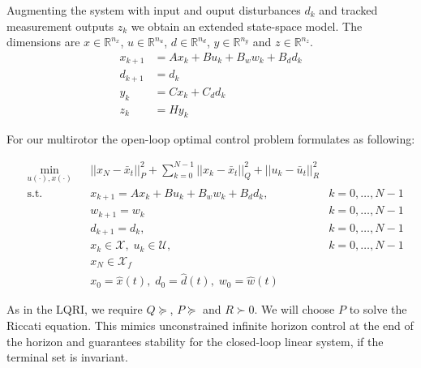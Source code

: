 Augmenting the system with input and ouput disturbances $d_k$ and tracked measurement outputs $z_k$ we obtain an extended state-space model. The dimensions are $x\in\mathbb{R}^{n_x}$, $u\in\mathbb{R}^{n_u}$, $d\in\mathbb{R}^{n_d}$, $y\in\mathbb{R}^{n_y}$ and $z\in\mathbb{R}^{n_z}$.
\begin{align}
x_{k+1} &= A x_k + B u_k + B_w w_k + B_d d_k \label{eq:MPC_dt}\\
d_{k+1} &= d_k \nonumber \\ 
y_{k} &= C x_k + C_d d_k \nonumber \\
z_k &= H y_k 
\end{align}

For our multirotor the open-loop optimal control problem formulates as following:

\begin{align}
&\min_{u(\cdot),x(\cdot)}
& & ||x_N-\bar{x}_t||_P^2 + \sum_{k=0}^{N-1} ||x_k - \bar{x}_t||_Q^2 + ||u_k - \bar{u}_t||_R^2  \nonumber\\
& \text{s.t.} 
& & x_{k+1} = A x_k + B u_k + B_w w_k + B_d d_k, & k = 0, \ldots, N-1 \nonumber\\
& & & w_{k+1} = w_k  & k = 0, \ldots, N-1 \nonumber\\
& & & d_{k+1} = d_k, & k = 0, \ldots, N-1 \nonumber\\
& & & x_k \in \mathcal{X}, \; u_k \in \mathcal{U}, & k = 0, \ldots, N-1 \nonumber\\
& & & x_N \in \mathcal{X}_f \nonumber\\
& & & x_0 = \hat x (t), \; d_0 = \hat d(t), \; w_0 = \hat w(t) \label{eq:mpc_opti}
\end{align}

As in the LQRI, we require $Q\succeq$, $P\succeq$ and $R\succ0$. We will choose $P$ to solve the Riccati equation. This mimics unconstrained infinite horizon control at the end of the horizon and guarantees stability for the closed-loop linear system, if the terminal set is invariant.

